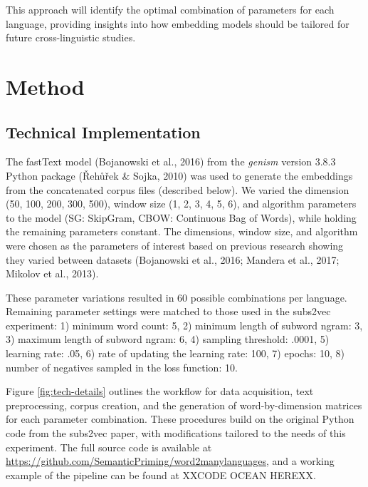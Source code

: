 \documentclass[
  english,
  man,floatsintext]{apa6}
\begin{document}
This approach will identify the optimal combination of parameters for each language, providing insights into how embedding models should be tailored for future cross-linguistic studies.

\section{Method}\label{method}

\subsection{Technical Implementation}\label{technical-implementation}

The fastText model (Bojanowski et al., 2016) from the \emph{genism} version 3.8.3 Python package (Řehůřek \& Sojka, 2010) was used to generate the embeddings from the concatenated corpus files (described below). We varied the dimension (50, 100, 200, 300, 500), window size (1, 2, 3, 4, 5, 6), and algorithm parameters to the model (SG: SkipGram, CBOW: Continuous Bag of Words), while holding the remaining parameters constant. The dimensions, window size, and algorithm were chosen as the parameters of interest based on previous research showing they varied between datasets (Bojanowski et al., 2016; Mandera et al., 2017; Mikolov et al., 2013).

These parameter variations resulted in 60 possible combinations per language. Remaining parameter settings were matched to those used in the subs2vec experiment: 1) minimum word count: 5, 2) minimum length of subword ngram: 3, 3) maximum length of subword ngram: 6, 4) sampling threshold: .0001, 5) learning rate: .05, 6) rate of updating the learning rate: 100, 7) epochs: 10, 8) number of negatives sampled in the loss function: 10.

Figure \ref{fig:tech-details} outlines the workflow for data acquisition, text preprocessing, corpus creation, and the generation of word-by-dimension matrices for each parameter combination. These procedures build on the original Python code from the subs2vec paper, with modifications tailored to the needs of this experiment. The full source code is available at \url{https://github.com/SemanticPriming/word2manylanguages}, and a working example of the pipeline can be found at XXCODE OCEAN HEREXX.
\end{document}
